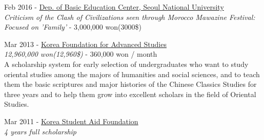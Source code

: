 \documentclass[10pt]{article} %
\begin{document}
{
Feb 2016 - \href{http://liberaleduenglish.snu.ac.kr/}{Dep. of Basic Education Center, Seoul National University}\\
\textit{Criticism of the Clash of Civilizations seen through Morocco Mawazine Festival: Focused on 'Family'} - 3,000,000 won(3000\$)\\
}

{
Mar 2013 - \href{http://www.kfas.or.kr/?pCulture=en}{Korea Foundation for Advanced Studies}\\
\textit{12,960,000 won(12,960\$)} - 360,000 won / month\\
A scholarship system for early selection of undergraduates who want to study oriental studies among the majors of humanities and social sciences, and to teach them the basic scriptures and major histories of the Chinese Classics Studies for three years and to help them grow into excellent scholars in the field of Oriental Studies.
}

{
Mar 2011 - \href{http://eng.kosaf.go.kr/jsp/main.jsp}{Korea Student Aid Foundation}\\
\textit{4 years full scholarship}\\
}
\fi

\end{document}
